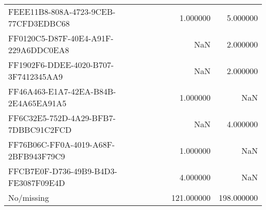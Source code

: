 \begin{tabular}{lrr}
FEEE11B8-808A-4723-9CEB-77CFD3EDBC68 & 1.000000 & 5.000000 \\
FF0120C5-D87F-40E4-A91F-229A6DDC0EA8 & NaN & 2.000000 \\
FF1902F6-DDEE-4020-B707-3F7412345AA9 & NaN & 2.000000 \\
FF46A463-E1A7-42EA-B84B-2E4A65EA91A5 & 1.000000 & NaN \\
FF6C32E5-752D-4A29-BFB7-7DBBC91C2FCD & NaN & 4.000000 \\
FF76B06C-FF0A-4019-A68F-2BFB943F79C9 & 1.000000 & NaN \\
FFCB7E0F-D736-49B9-B4D3-FE3087F09E4D & 4.000000 & NaN \\
No/missing & 121.000000 & 198.000000 \\
\bottomrule
\end{tabular}
